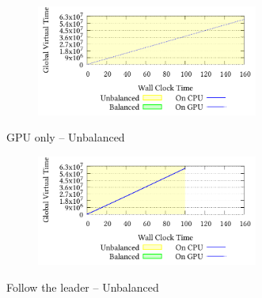\documentclass[8pt]{article}
\begin{document}
\setcounter{figure}{1}
\renewcommand{\thefigure}{\arabic{figure}e}
\begin{figure}[!h]
\centering
\begin{subfigure}[b]{\mysize}
\centering
\includegraphics[width=0.8\textwidth]{figures_original/unbalanced/2.processed.pdf}
\renewcommand{\thesubfigure}{Original}
\caption{}
\end{subfigure}
\begin{subfigure}[b]{\mysize}
\centering
{}
\renewcommand{\thesubfigure}{Reproduced}
\caption{}
\end{subfigure}
\caption{GPU only – Unbalanced}
\end{figure}



\setcounter{figure}{1}
\renewcommand{\thefigure}{\arabic{figure}h}
\begin{figure}[!h]
\centering
\begin{subfigure}[b]{\mysize}
\centering
\includegraphics[width=0.8\textwidth]{figures_original/unbalanced/3.processed.pdf}
\renewcommand{\thesubfigure}{Original}
\caption{}
\end{subfigure}
\begin{subfigure}[b]{\mysize}
\centering
{}
\renewcommand{\thesubfigure}{Reproduced}
\caption{}
\end{subfigure}
\caption{Follow the leader – Unbalanced}
\end{figure}
\end{document}
